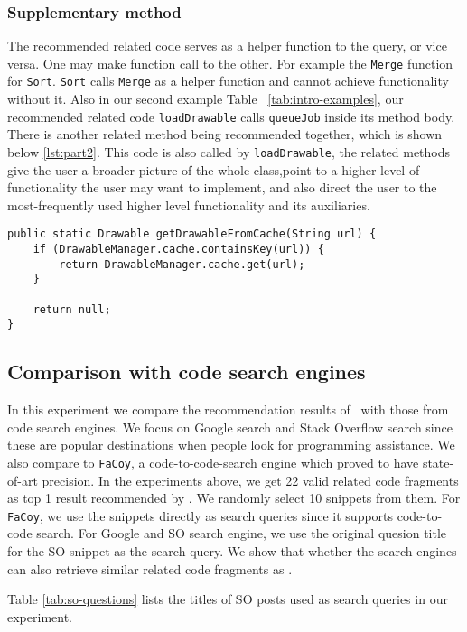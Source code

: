 \subsubsection{Supplementary method} The recommended related code serves as a helper function to the query, or vice versa. One may make function call to the other. For example the \texttt{Merge} function for \texttt{Sort}. \texttt{Sort} calls \texttt{Merge} as a helper function and cannot achieve functionality without it. Also in our second example Table ~\ref{tab:intro-examples}, our recommended related code \texttt{loadDrawable} calls \texttt{queueJob} inside its method body. There is another related method being recommended together, which is shown below \ref{lst:part2}. This code is also called by \texttt{loadDrawable}, the related methods give the user a broader picture of the whole class,point to a higher level of functionality the user may want to implement, and also direct the user to the most-frequently used higher level functionality and its auxiliaries.
\begin{lstlisting}[caption={Recommended code \#2}, label={lst:part2}]
public static Drawable getDrawableFromCache(String url) {
	if (DrawableManager.cache.containsKey(url)) {
		return DrawableManager.cache.get(url);
	}
	
	return null;
}	
\end{lstlisting}



\subsection{Comparison with code search engines}
In this experiment we compare the recommendation results of \tool\ with those from code search engines. We focus on Google search and Stack Overflow search since these are popular destinations when people look for programming assistance. We also compare to \texttt{FaCoy}, a code-to-code-search engine which proved to have state-of-art precision. In the experiments above, we get 22 valid related code fragments as top 1 result recommended by \tool. We randomly select 10 snippets from them. For \texttt{FaCoy}, we use the snippets directly as search queries since it supports code-to-code search. For Google and SO search engine, we use the original quesion title for the SO snippet as the search query. We show that whether the search engines can also retrieve similar related code fragments as \tool. 

Table \ref{tab:so-questions} lists the titles of SO posts used as search queries in our experiment.

